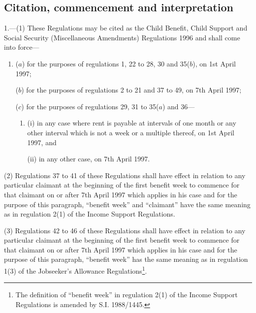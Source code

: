 \documentclass[12pt,a4paper]{article}
\begin{document}
{\sloppy

\tableofcontents

}

\setcounter{secnumdepth}{-2}

\subsection[1. Citation, commencement and interpretation]{Citation, commencement and interpretation}

1.—(1) These Regulations may be cited as the Child Benefit, Child Support and Social Security (Miscellaneous Amendments) Regulations 1996 and shall come into force—
\begin{enumerate}\item[]
($a$) for the purposes of regulations 1, 22 to 28, 30 and 35($b$), on 1st April 1997;

($b$) for the purposes of regulations 2 to 21 and 37 to 49, on 7th April 1997;

($c$) for the purposes of regulations 29, 31 to 35($a$) and 36—
\begin{enumerate}\item[]
(i) in any case where rent is payable at intervals of one month or any other interval which is not a week or a multiple thereof, on 1st April 1997, and

(ii) in any other case, on 7th April 1997.
\end{enumerate}
\end{enumerate}

(2) Regulations 37 to 41 of these Regulations shall have effect in relation to any particular claimant at the beginning of the first benefit week to commence for that claimant on or after 7th April 1997 which applies in his case and for the purpose of this paragraph, “benefit week” and “claimant” have the same meaning as in regulation 2(1) of the Income Support Regulations.

(3) Regulations 42 to 46 of these Regulations shall have effect in relation to any particular claimant at the beginning of the first benefit week to commence for that claimant on or after 7th April 1997 which applies in his case and for the purpose of this paragraph, “benefit week” has the same meaning as in regulation 1(3) of the Jobseeker’s Allowance Regulations\footnote{\frenchspacing The definition of “benefit week” in regulation 2(1) of the Income Support Regulations is amended by S.I. 1988/1445.}.
\end{document}
